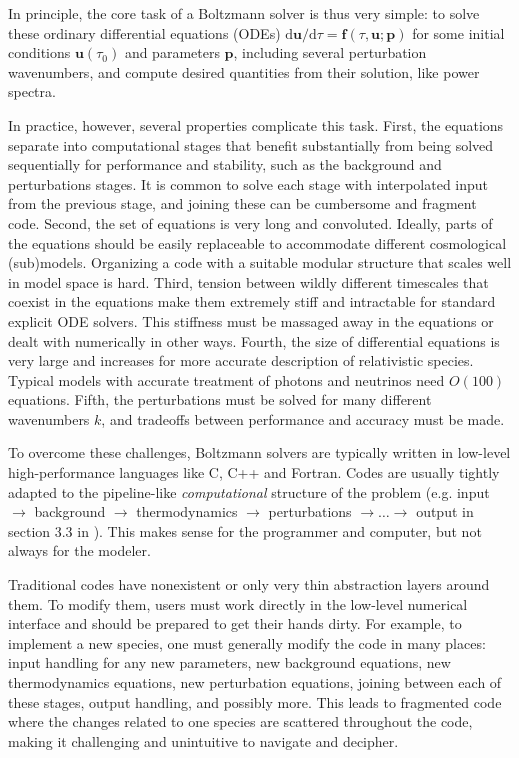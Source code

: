 \documentclass{aa}
\begin{document}
In principle, the core task of a Boltzmann solver is thus very simple:
to solve these ordinary differential equations (ODEs) ${\mathrm{d}\mathbf{u}}/{\mathrm{d} \tau} = \mathbf{f}(\tau,\mathbf{u};\mathbf{p})$ for some initial conditions $\mathbf{u}(\tau_0)$ and parameters $\mathbf{p}$, including several perturbation wavenumbers, and compute desired quantities from their solution, like power spectra.

In practice, however, several properties complicate this task.
First, the equations separate into computational stages that benefit substantially from being solved sequentially for performance and stability, such as the background and perturbations stages.
It is common to solve each stage with interpolated input from the previous stage, and joining these can be cumbersome and fragment code. %
Second, the set of equations is very long and convoluted.
Ideally, parts of the equations should be easily replaceable to accommodate different cosmological (sub)models.
Organizing a code with a suitable modular structure that scales well in model space is hard.
Third, tension between wildly different timescales that coexist in the equations make them extremely stiff and intractable for standard explicit ODE solvers.
This stiffness must be massaged away in the equations or dealt with numerically in other ways.
Fourth, the size of differential equations is very large and increases for more accurate description of relativistic species.
Typical models with accurate treatment of photons and neutrinos need $O(100)$ equations.
Fifth, the perturbations must be solved for many different wavenumbers $k$, and tradeoffs between performance and accuracy must be made.

To overcome these challenges, Boltzmann solvers are typically written in low-level high-performance languages like C, C++ and Fortran.
Codes are usually tightly adapted to the pipeline-like \emph{computational} structure of the problem (e.g. input $\rightarrow$ background $\rightarrow$ thermodynamics $\rightarrow$ perturbations $\rightarrow \ldots \rightarrow$ output in section 3.3 in \cite{lesgourguesCosmicLinearAnisotropy2011}).
This makes sense for the programmer and computer, but not always for the modeler.

Traditional codes have nonexistent or only very thin abstraction layers around them.
To modify them, users must work directly in the low-level numerical interface and should be prepared to get their hands dirty.
For example, to implement a new species, one must generally modify the code in many places: input handling for any new parameters, new background equations, new thermodynamics equations, new perturbation equations, joining between each of these stages, output handling, and possibly more.
This leads to fragmented code where the changes related to one species are scattered throughout the code, making it challenging and unintuitive to navigate and decipher.
\end{document}
